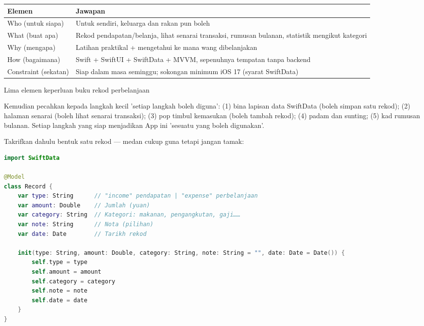


\begin{center}
\begin{tabularx}{\linewidth}{|X|X|}
\hline
\textbf{Elemen} & \textbf{Jawapan} \tabularnewline
\hline
Who (untuk siapa) & Untuk sendiri, keluarga dan rakan pun boleh \tabularnewline
What (buat apa) & Rekod pendapatan/belanja, lihat senarai transaksi, rumusan bulanan, statistik mengikut kategori \tabularnewline
Why (mengapa) & Latihan praktikal + mengetahui ke mana wang dibelanjakan \tabularnewline
How (bagaimana) & Swift + SwiftUI + SwiftData + MVVM, sepenuhnya tempatan tanpa backend \tabularnewline
Constraint (sekatan) & Siap dalam masa seminggu; sokongan minimum iOS 17 (syarat SwiftData) \tabularnewline
\hline
\end{tabularx}
\end{center}

\begin{center}\small\color{gray}Lima elemen keperluan buku rekod perbelanjaan\end{center}

Kemudian pecahkan kepada langkah kecil 'setiap langkah boleh diguna': (1) bina lapisan data SwiftData (boleh simpan satu rekod); (2) halaman senarai (boleh lihat senarai transaksi); (3) pop timbul kemasukan (boleh tambah rekod); (4) padam dan sunting; (5) kad rumusan bulanan. Setiap langkah yang siap menjadikan App ini 'sesuatu yang boleh digunakan'.


Takrifkan dahulu bentuk satu rekod — medan cukup guna tetapi jangan tamak:

\begin{lstlisting}[language=Swift]
import SwiftData

@Model
class Record {
    var type: String      // "income" pendapatan | "expense" perbelanjaan
    var amount: Double    // Jumlah (yuan)
    var category: String  // Kategori: makanan, pengangkutan, gaji……
    var note: String      // Nota (pilihan)
    var date: Date        // Tarikh rekod

    init(type: String, amount: Double, category: String, note: String = "", date: Date = Date()) {
        self.type = type
        self.amount = amount
        self.category = category
        self.note = note
        self.date = date
    }
}
\end{lstlisting}

